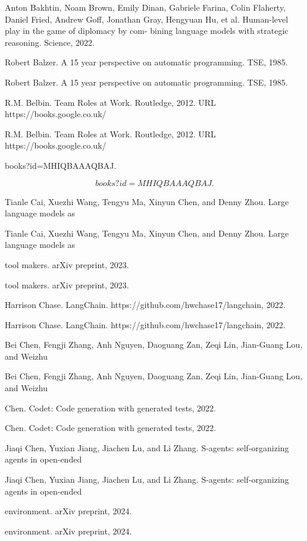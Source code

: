 \documentclass[12pt]{article}
\begin{document}
Anton Bakhtin, Noam Brown, Emily Dinan, Gabriele Farina, Colin Flaherty, Daniel Fried, Andrew
Goff, Jonathan Gray, Hengyuan Hu, et al. Human-level play in the game of diplomacy by com-
bining language models with strategic reasoning. Science, 2022.


Robert Balzer. A 15 year perspective on automatic programming. TSE, 1985.


Robert Balzer. A 15 year perspective on automatic programming. TSE, 1985.


R.M. Belbin. Team Roles at Work. Routledge, 2012. URL https://books.google.co.uk/


R.M. Belbin. Team Roles at Work. Routledge, 2012. URL https://books.google.co.uk/


books?id=MHIQBAAAQBAJ.


\begin{equation}
books?id=MHIQBAAAQBAJ.
\end{equation}


Tianle Cai, Xuezhi Wang, Tengyu Ma, Xinyun Chen, and Denny Zhou. Large language models as


Tianle Cai, Xuezhi Wang, Tengyu Ma, Xinyun Chen, and Denny Zhou. Large language models as


tool makers. arXiv preprint, 2023.


tool makers. arXiv preprint, 2023.


Harrison Chase. LangChain. https://github.com/hwchase17/langchain, 2022.


Harrison Chase. LangChain. https://github.com/hwchase17/langchain, 2022.


Bei Chen, Fengji Zhang, Anh Nguyen, Daoguang Zan, Zeqi Lin, Jian-Guang Lou, and Weizhu


Bei Chen, Fengji Zhang, Anh Nguyen, Daoguang Zan, Zeqi Lin, Jian-Guang Lou, and Weizhu


Chen. Codet: Code generation with generated tests, 2022.


Chen. Codet: Code generation with generated tests, 2022.


Jiaqi Chen, Yuxian Jiang, Jiachen Lu, and Li Zhang. S-agents: self-organizing agents in open-ended


Jiaqi Chen, Yuxian Jiang, Jiachen Lu, and Li Zhang. S-agents: self-organizing agents in open-ended


environment. arXiv preprint, 2024.


environment. arXiv preprint, 2024.
\end{document}
